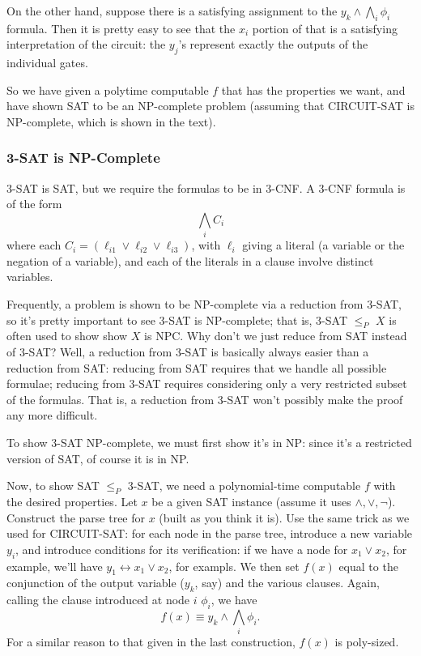 \documentclass{article}
\begin{document}
On the other hand, suppose there is a satisfying assignment to the
$
y_k \wedge \bigwedge_i \phi_i
$
formula. Then it is pretty easy to see that the $x_i$ portion of that
is a satisfying interpretation of the circuit: the $y_j$'s represent exactly
the outputs of the individual gates.

So we have given a polytime computable $f$ that has the properties we want,
and have shown SAT to be an NP-complete problem (assuming that CIRCUIT-SAT
is NP-complete, which is shown in the text).


\subsubsection{3-SAT is NP-Complete}

3-SAT is SAT, but we require the formulas to be in 3-CNF.
A 3-CNF formula is of the form
$$
\bigwedge_i C_i
$$
where each $C_i = (\ell_{i1} \vee \ell_{i2} \vee \ell_{i3})$, with
$\ell_i$ giving a literal (a variable or the negation of a variable), and
each of the literals in a clause involve distinct variables.

Frequently, a problem is shown to be NP-complete via a reduction from 3-SAT,
so it's pretty important to see 3-SAT is NP-complete; that is, 3-SAT $\leq_P$
$X$ is often used to show show $X$ is NPC.
Why don't we just reduce from SAT instead of 3-SAT?
Well, a reduction from 3-SAT is basically always easier than a reduction
from SAT: reducing from SAT requires that we handle all possible formulae;
reducing from 3-SAT requires considering only a very restricted subset
of the formulas.
That is, a reduction from 3-SAT won't possibly make the proof any more 
difficult.

To show 3-SAT NP-complete, we must first show it's in NP: since it's a 
restricted version of SAT, of course it is in NP.

Now, to show SAT $\leq_P$ 3-SAT, we need a polynomial-time computable
$f$ with the desired properties.
Let $x$ be a given SAT instance (assume it uses $\wedge,\vee,\neg$).
Construct the parse tree for $x$ (built as you think it is).
Use the same trick as we used for CIRCUIT-SAT: for each node in the parse
tree, introduce a new variable $y_i$, and introduce conditions for its
verification: if we have a node for $x_1\vee x_2$, for example, we'll have
$y_1\leftrightarrow x_1\vee x_2$, for exampls.
We then set $f(x)$ equal to the conjunction of the output variable ($y_k$, say)
and the various clauses.
Again, calling the clause introduced at node $i$ $\phi_i$, we have
$$
f(x) \equiv y_k \wedge
\bigwedge_i \phi_i.
$$
For a similar reason to that given in the last construction, $f(x)$ is
poly-sized.
\end{document}
